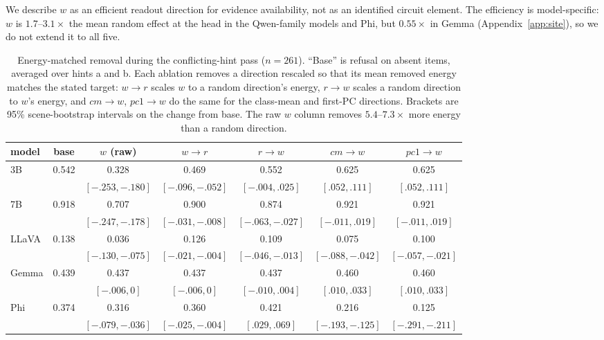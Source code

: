 \documentclass[10pt]{article}
\newcommand{\wdir}{w}
\begin{document}
We describe $\wdir$ as an efficient readout direction for evidence availability, not as an identified circuit element. The efficiency is model-specific: $\wdir$ is $1.7$--$3.1\times$ the mean random effect at the head in the Qwen-family models and Phi, but $0.55\times$ in Gemma (Appendix~\ref{app:site}), so we do not extend it to all five.

\begin{table}[t]
\centering
\small
\setlength{\tabcolsep}{4pt}
\caption{Energy-matched removal during the conflicting-hint pass ($n=261$). ``Base'' is refusal on absent items, averaged over hints a and b. Each ablation removes a direction rescaled so that its mean removed energy matches the stated target: $\wdir{\to}r$ scales $\wdir$ to a random direction's energy, $r{\to}\wdir$ scales a random direction to $\wdir$'s energy, and $cm{\to}\wdir$, $pc1{\to}\wdir$ do the same for the class-mean and first-PC directions. Brackets are 95\% scene-bootstrap intervals on the change from base. The raw $\wdir$ column removes $5.4$--$7.3\times$ more energy than a random direction.}
\label{tab:matched}
\begin{tabular}{lcccccc}
\toprule
model & base & $\wdir$ (raw) & $\wdir{\to}r$ & $r{\to}\wdir$ & $cm{\to}\wdir$ & $pc1{\to}\wdir$ \\
\midrule
3B & 0.542 & 0.328 & 0.469 & 0.552 & 0.625 & 0.625 \\
   & & $[-.253,-.180]$ & $[-.096,-.052]$ & $[-.004,.025]$ & $[.052,.111]$ & $[.052,.111]$ \\
\midrule
7B & 0.918 & 0.707 & 0.900 & 0.874 & 0.921 & 0.921 \\
   & & $[-.247,-.178]$ & $[-.031,-.008]$ & $[-.063,-.027]$ & $[-.011,.019]$ & $[-.011,.019]$ \\
\midrule
LLaVA & 0.138 & 0.036 & 0.126 & 0.109 & 0.075 & 0.100 \\
      & & $[-.130,-.075]$ & $[-.021,-.004]$ & $[-.046,-.013]$ & $[-.088,-.042]$ & $[-.057,-.021]$ \\
\midrule
Gemma & 0.439 & 0.437 & 0.437 & 0.437 & 0.460 & 0.460 \\
      & & $[-.006,0]$ & $[-.006,0]$ & $[-.010,.004]$ & $[.010,.033]$ & $[.010,.033]$ \\
\midrule
Phi & 0.374 & 0.316 & 0.360 & 0.421 & 0.216 & 0.125 \\
    & & $[-.079,-.036]$ & $[-.025,-.004]$ & $[.029,.069]$ & $[-.193,-.125]$ & $[-.291,-.211]$ \\
\bottomrule
\end{tabular}
\end{table}
\end{document}
